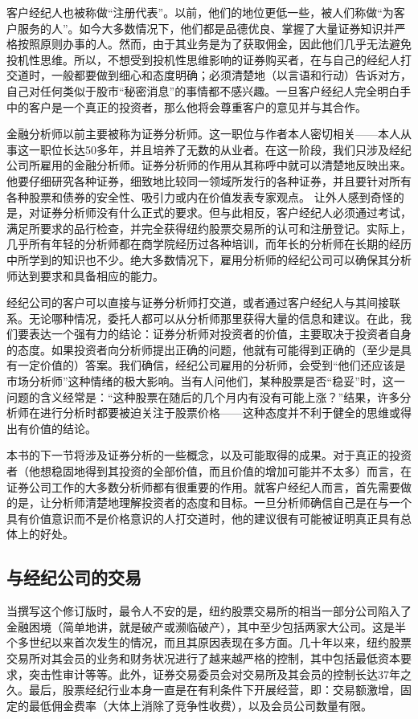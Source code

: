 \documentclass[12pt,oneside]{book}
\begin{document}
客户经纪人也被称做“注册代表”。以前，他们的地位更低一些，被人们称做“为客户服务的人”。如今大多数情况下，他们都是品德优良、掌握了大量证券知识并严格按照原则办事的人。然而，由于其业务是为了获取佣金，因此他们几乎无法避免投机性思维。所以，不想受到投机性思维影响的证券购买者，在与自己的经纪人打交道时，一般都要做到细心和态度明确；必须清楚地（以言语和行动）告诉对方，自己对任何类似于股市“秘密消息”的事情都不感兴趣。一旦客户经纪人完全明白手中的客户是一个真正的投资者，那么他将会尊重客户的意见并与其合作。

金融分析师以前主要被称为证券分析师。这一职位与作者本人密切相关——本人从事这一职位长达50多年，并且培养了无数的从业者。在这一阶段，我们只涉及经纪公司所雇用的金融分析师。证券分析师的作用从其称呼中就可以清楚地反映出来。他要仔细研究各种证券，细致地比较同一领域所发行的各种证券，并且要针对所有各种股票和债券的安全性、吸引力或内在价值发表专家观点。
让外人感到奇怪的是，对证券分析师没有什么正式的要求。但与此相反，客户经纪人必须通过考试，满足所要求的品行检查，并完全获得纽约股票交易所的认可和注册登记。实际上，几乎所有年轻的分析师都在商学院经历过各种培训，而年长的分析师在长期的经历中所学到的知识也不少。绝大多数情况下，雇用分析师的经纪公司可以确保其分析师达到要求和具备相应的能力。

经纪公司的客户可以直接与证券分析师打交道，或者通过客户经纪人与其间接联系。无论哪种情况，委托人都可以从分析师那里获得大量的信息和建议。在此，我们要表达一个强有力的结论：证券分析师对投资者的价值，主要取决于投资者自身的态度。如果投资者向分析师提出正确的问题，他就有可能得到正确的（至少是具有一定价值的）答案。我们确信，经纪公司雇用的分析师，会受到“他们还应该是市场分析师”这种情绪的极大影响。当有人问他们，某种股票是否“稳妥”时，这一问题的含义经常是：“这种股票在随后的几个月内有没有可能上涨？”结果，许多分析师在进行分析时都要被迫关注于股票价格——这种态度并不利于健全的思维或得出有价值的结论。

本书的下一节将涉及证券分析的一些概念，以及可能取得的成果。对于真正的投资者（他想稳固地得到其投资的全部价值，而且价值的增加可能并不太多）而言，在证券公司工作的大多数分析师都有很重要的作用。就客户经纪人而言，首先需要做的是，让分析师清楚地理解投资者的态度和目标。一旦分析师确信自己是在与一个具有价值意识而不是价格意识的人打交道时，他的建议很有可能被证明真正具有总体上的好处。


\subsection{与经纪公司的交易}
当撰写这个修订版时，最令人不安的是，纽约股票交易所的相当一部分公司陷入了金融困境（简单地讲，就是破产或濒临破产），其中至少包括两家大公司。这是半个多世纪以来首次发生的情况，而且其原因表现在多方面。几十年以来，纽约股票交易所对其会员的业务和财务状况进行了越来越严格的控制，其中包括最低资本要求，突击性审计等等。此外，证券交易委员会对交易所及其会员的控制长达37年之久。最后，股票经纪行业本身一直是在有利条件下开展经营，即：交易额激增，固定的最低佣金费率（大体上消除了竞争性收费），以及会员公司数量有限。
\end{document}
